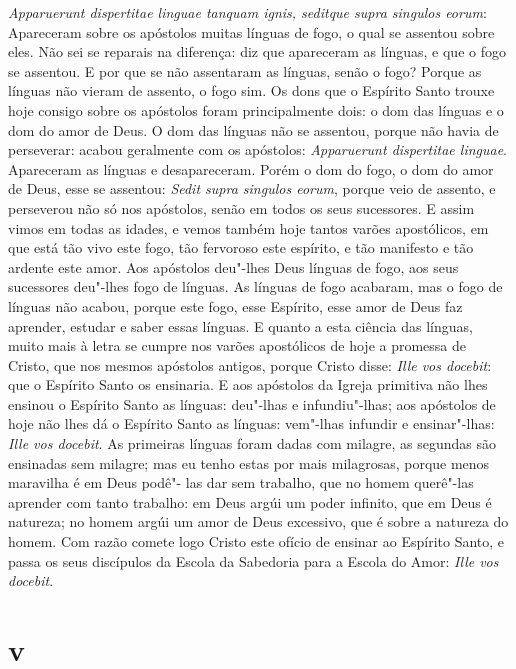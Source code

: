 \emph{Apparuerunt dispertitae linguae tanquam ignis, seditque supra
singulos eorum}: Apareceram sobre os apóstolos muitas línguas %
de fogo, o qual se assentou sobre eles. Não sei se reparais na
diferença: diz que apareceram as línguas, e que o fogo se assentou. E
por que se não assentaram as línguas, senão o fogo? Porque as línguas
não vieram de assento, o fogo sim. Os dons que o Espírito Santo trouxe
hoje consigo sobre os apóstolos foram principalmente dois: o dom das
línguas e o dom do amor de Deus. O dom das línguas não se assentou,
porque não havia de perseverar: acabou geralmente com os apóstolos:
\emph{Apparuerunt dispertitae linguae}. Apareceram as línguas e
desapareceram. Porém o dom do fogo, o dom do amor de Deus, esse se
assentou: \emph{Sedit supra singulos eorum}, porque veio de assento, e
perseverou não só nos apóstolos, senão em todos os seus sucessores. E
assim vimos em todas as idades, e vemos também hoje tantos varões
apostólicos, em que está tão vivo este fogo, tão fervoroso este
espírito, e tão manifesto e tão ardente este amor. Aos apóstolos
deu"-lhes Deus línguas de fogo, aos seus sucessores deu"-lhes fogo de
línguas. As línguas de fogo acabaram, mas o fogo de línguas não acabou,
porque este fogo, esse Espírito, esse amor de Deus faz aprender, estudar
e saber essas línguas. E quanto a esta ciência das línguas, muito mais à
letra se cumpre nos varões apostólicos de hoje a promessa de Cristo, que
nos mesmos apóstolos antigos, porque Cristo disse: \emph{Ille vos
docebit}: que o Espírito Santo os ensinaria. E aos apóstolos da Igreja
primitiva não lhes ensinou o Espírito Santo as línguas: deu"-lhas e
infundiu"-lhas; aos apóstolos de hoje não lhes dá o Espírito Santo as
línguas: vem"-lhas infundir e ensinar"-lhas: \emph{Ille vos docebit}. As
primeiras
línguas foram dadas com milagre, as segundas são ensinadas sem milagre;
mas eu tenho estas por mais milagrosas, porque menos maravilha é em Deus
podê"- las dar sem trabalho, que no homem querê"-las aprender com tanto
trabalho: em Deus argúi um poder infinito, que em Deus é natureza; no
homem argúi um amor de Deus excessivo, que é sobre a natureza do homem.
Com razão comete logo Cristo este ofício de ensinar ao Espírito Santo, e
passa os seus discípulos da Escola da Sabedoria para a Escola do Amor:
\emph{Ille vos docebit}.

\section*{v}


